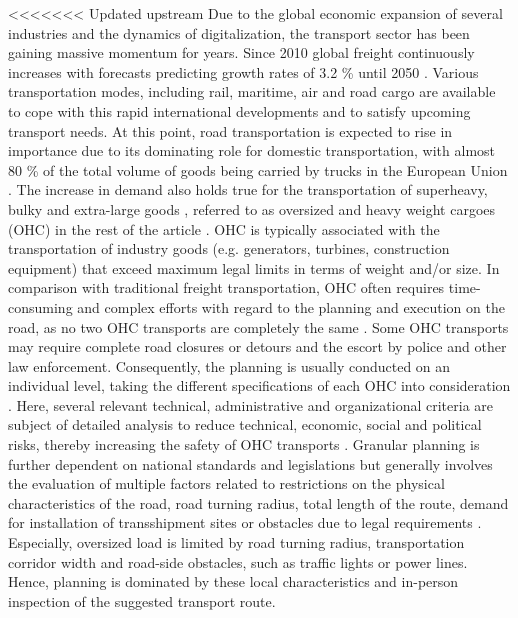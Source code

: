 
<<<<<<< Updated upstream
Due to the global economic expansion of several industries and the dynamics of digitalization, the transport sector has been gaining massive momentum for years.
Since 2010 global freight continuously increases with forecasts predicting growth rates of 3.2 \% until 2050 \cite{figura2020preferences, InternationalTransportForum}.
Various transportation modes, including rail, maritime, air and road cargo are available to cope with this rapid international developments and to satisfy upcoming transport needs.
At this point, road transportation is expected to rise in importance due to its dominating role for domestic transportation, with almost 80 \% of the total volume of goods being carried by trucks in the European Union \cite{Eurostat}.
The increase in demand also holds true for the transportation of superheavy, bulky and extra-large goods \cite{gavrilova2021analysis}, referred to as oversized and heavy weight cargoes (OHC) in the rest of the article \cite{Luo.2021}.
OHC is typically associated with the transportation of industry goods (e.g. generators, turbines, construction equipment) that exceed maximum legal limits in terms of weight and/or size.
In comparison with traditional freight transportation, OHC often requires time-consuming and complex efforts with regard to the planning and execution on the road, as no two OHC transports are completely the same \cite{Wolnowska.2019}.
Some OHC transports may require complete road closures or detours and the escort by police and other law enforcement.
Consequently, the planning is usually conducted on an individual level, taking the different specifications of each OHC into consideration \cite{Bazaras.2013}.
Here, several relevant technical, administrative and organizational criteria are subject of detailed analysis to reduce technical, economic, social and political risks, thereby increasing the safety of OHC transports \cite{Palsaitis. 2012}.
Granular planning is further dependent on national standards and legislations but generally involves the evaluation of multiple factors related to restrictions on the physical characteristics of the road, road turning radius, total length of the route, demand for installation of transshipment sites or obstacles due to legal requirements \cite{PETRASKA.2018}.
Especially, oversized load is limited by road turning radius, transportation corridor width and road-side obstacles, such as traffic lights or power lines. Hence, planning is dominated by these local characteristics and in-person inspection of the suggested transport route.

